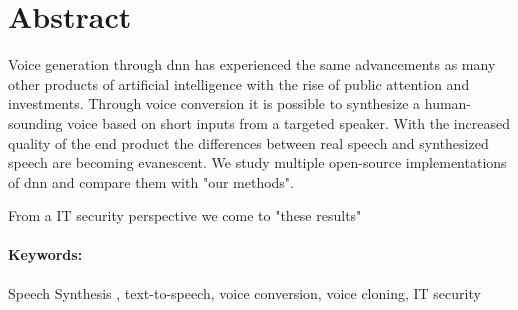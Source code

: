 
\newpage
\section*{Abstract}

Voice generation through \gls{dnn} has experienced the same advancements as many other products of artificial intelligence with the rise of public attention and investments. Through voice conversion it is possible to synthesize a human-sounding voice based on short inputs from a targeted speaker. With the increased quality of the end product the differences between real speech and synthesized speech are becoming evanescent.
We study multiple open-source implementations of \gls{dnn} and compare them with "our methods". %

From a IT security perspective we come to "these results" %


\paragraph{Keywords:}
Speech Synthesis , text-to-speech, voice conversion, voice cloning, IT security

\clearpage